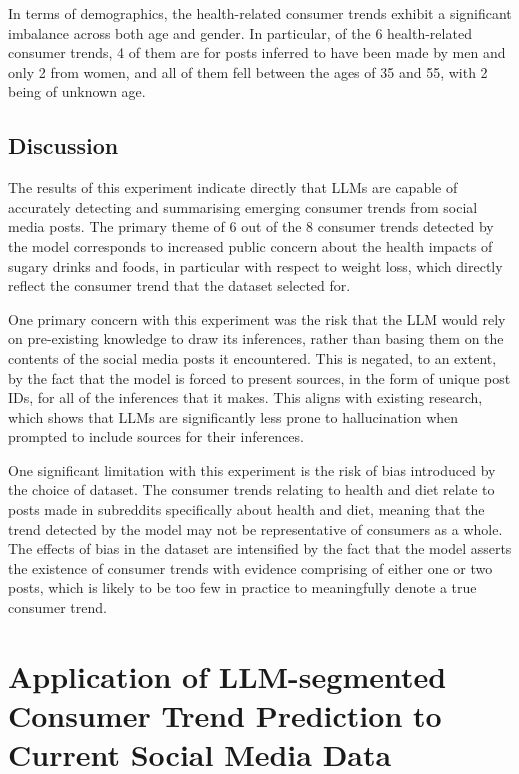 \documentclass{report}
\begin{document}
In terms of demographics, the health-related consumer trends exhibit a significant imbalance across both age and gender. In particular, of the 6 health-related consumer trends, 4 of them are for posts inferred to have been made by men and only 2 from women, and all of them fell between the ages of 35 and 55, with 2 being of unknown age.


\section{Discussion}

The results of this experiment indicate directly that LLMs are capable of accurately detecting and summarising emerging consumer trends from social media posts. The primary theme of 6 out of the 8 consumer trends detected by the model corresponds to increased public concern about the health impacts of sugary drinks and foods, in particular with respect to weight loss, which directly reflect the consumer trend that the dataset selected for.

One primary concern with this experiment was the risk that the LLM would rely on pre-existing knowledge to draw its inferences, rather than basing them on the contents of the social media posts it encountered. This is negated, to an extent, by the fact that the model is forced to present sources, in the form of unique post IDs, for all of the inferences that it makes. This aligns with existing research, which shows that LLMs are significantly less prone to hallucination when prompted to include sources for their inferences\cite{gao2023enabling}.

One significant limitation with this experiment is the risk of bias introduced by the choice of dataset. The consumer trends relating to health and diet relate to posts made in subreddits specifically about health and diet, meaning that the trend detected by the model may not be representative of consumers as a whole. The effects of bias in the dataset are intensified by the fact that the model asserts the existence of consumer trends with evidence comprising of either one or two posts, which is likely to be too few in practice to meaningfully denote a true consumer trend.

\chapter{Application of LLM-segmented Consumer Trend Prediction to Current Social Media Data}
\end{document}
